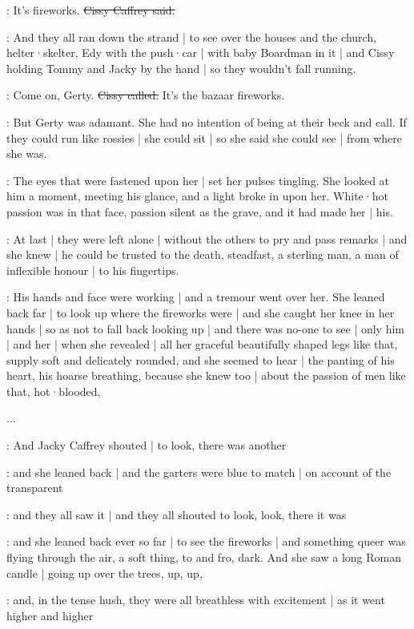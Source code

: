 \cissy:
It's fireworks.
\sout{Cissy Caffrey said.}

:
And they all ran down the strand |
to see over the houses
and the church,
helter·skelter,
Edy with the push·car |
with baby Boardman in it |
and Cissy holding Tommy and Jacky by the hand |
so they wouldn't fall running.

\cissy:
Come on,
Gerty.
\sout{Cissy called.}
It's the bazaar fireworks.

\gertyReal:
But Gerty was adamant.
She had no intention
of being at their beck and call.
If they could run like rossies |
she could sit |
so she said she could see |
from where she was.

\gertySex:
The eyes that were fastened upon her |
set her pulses tingling.%
She looked at him a moment,
meeting his glance,
and a light broke in upon her.
White·hot passion was in that face,
passion silent as the grave,
and it had made her |
his.

\gertyNovel:
At last |
they were left alone |
without the others to pry and pass remarks |
and she knew |
he could be trusted to the death,
steadfast,
a sterling man,
a man of inflexible honour |
to his fingertips.

\gertySex:
His hands and face were working |
and a tremour went over her.
She leaned back far |
to look up
where the fireworks were |
and she caught her knee in her hands |
so as not to fall back looking up |
and there was no-one to see |
only him |
and her |
when she revealed |
all her graceful beautifully shaped legs like that,
supply soft and delicately rounded,
and she seemed to hear |
the panting of his heart,
his hoarse breathing,%
because she knew too |
about the passion of men like that,
hot·blooded,

...

:
And Jacky Caffrey shouted |
to look,
there was another

\gertySex:
and she leaned back |
and the garters were blue to match |
on account of the transparent

:
and they all saw it |
and they all shouted to look,
look,
there it was

\gertySex:
and she leaned back ever so far |
to see the fireworks |
and something queer was flying through the air,
a soft thing,
to and fro,
dark.
And she saw a long Roman candle |
going up over the trees,%
up,
up,

:
and,
in the tense hush,
they were all breathless with excitement |
as it went higher and higher

